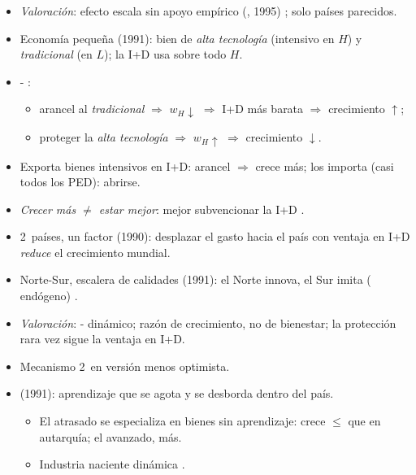 \documentclass{article}
\begin{document}
\begin{columnas}
\begin{itemize}
\item \emph{Valoración}: efecto escala sin apoyo empírico (, 1995) ; solo países parecidos.
\end{itemize}
\begin{itemize}
\item Economía pequeña (1991): bien de \emph{alta tecnología} (intensivo en $H$) y \emph{tradicional} (en $L$); la I+D usa sobre todo $H$.
\item {}- :
  \begin{itemize}
  \item arancel al \emph{tradicional} $\Rightarrow$ $w_H\downarrow$ $\Rightarrow$ I+D más barata $\Rightarrow$ crecimiento $\uparrow$;
  \item proteger la \emph{alta tecnología} $\Rightarrow$ $w_H\uparrow$ $\Rightarrow$ crecimiento $\downarrow$.
  \end{itemize}
\item Exporta bienes intensivos en I+D: arancel $\Rightarrow$ crece más; los importa (casi todos los PED): abrirse.
\item \emph{Crecer más $\neq$ estar mejor}: mejor subvencionar la I+D .
\item 2~países, un factor (1990): desplazar el gasto hacia el país con ventaja en I+D \emph{reduce} el crecimiento mundial.
\item Norte-Sur, escalera de calidades (1991): el Norte innova, el Sur imita ( endógeno) .
\item \emph{Valoración}: - dinámico; razón de crecimiento, no de bienestar; la protección rara vez sigue la ventaja en I+D.
\end{itemize}
\begin{itemize}
\item Mecanismo 2~en versión menos optimista.
\item {} (1991): aprendizaje que se agota y se desborda dentro del país.
  \begin{itemize}
  \item El atrasado se especializa en bienes sin aprendizaje: crece $\leq$ que en autarquía; el avanzado, más.
  \item Industria naciente dinámica .

\end{itemize}
\end{itemize}
\end{columnas}
\end{document}
